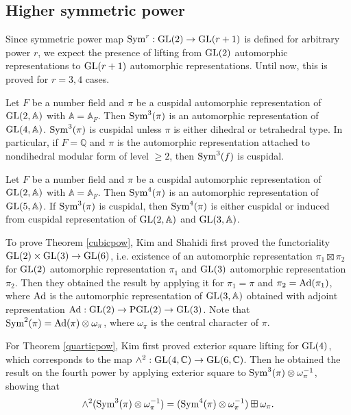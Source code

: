 \subsection{Higher symmetric power}
Since symmetric power map $\mathrm{Sym}^{r}:\operatorname{\mathrm{GL}}(2) \to \operatorname{\mathrm{GL}}(r+1)$ is defined for arbitrary power $r$, we expect the presence of lifting from $\operatorname{\mathrm{GL}}(2)$ automorphic representations to $\operatorname{\mathrm{GL}}(r+1)$ automorphic representations.
Until now, this is proved for $r = 3, 4$ cases.

\begin{theorem}
\label{cubicpow}
Let $F$ be a number field and $\pi$ be a cuspidal automorphic representation of $\operatorname{\mathrm{GL}}(2, \mathbb{A})$ with $\mathbb{A} = \mathbb{A}_{F}$.
Then $\mathrm{Sym}^{3}(\pi)$ is an automorphic representation of $\operatorname{\mathrm{GL}}(4, \mathbb{A})$.
$\mathrm{Sym}^{3}(\pi)$ is cuspidal unless $\pi$ is either dihedral or tetrahedral type.
In particular, if $F = \mathbb{Q}$ and $\pi$ is the automorphic representation attached to nondihedral modular form of level $\geq 2$, then $\mathrm{Sym}^{3}(f)$ is cuspidal.
\end{theorem}


\begin{theorem}
\label{quarticpow}
Let $F$ be a number field and $\pi$ be a cuspidal automorphic representation of $\operatorname{\mathrm{GL}}(2, \mathbb{A})$ with $\mathbb{A} = \mathbb{A}_{F}$.
Then $\mathrm{Sym}^{4}(\pi)$ is an automorphic representation of $\operatorname{\mathrm{GL}}(5, \mathbb{A})$.
If $\mathrm{Sym}^{3}(\pi)$ is cuspidal, then $\mathrm{Sym}^{4}(\pi)$ is either cuspidal or induced from cuspidal representation of $\operatorname{\mathrm{GL}}(2, \mathbb{A})$ and $\operatorname{\mathrm{GL}}(3, \mathbb{A})$.
\end{theorem}

To prove Theorem \ref{cubicpow}, Kim and Shahidi first proved the functoriality $\operatorname{\mathrm{GL}}(2) \times \operatorname{\mathrm{GL}}(3) \to \operatorname{\mathrm{GL}}(6)$, i.e. existence of an automorphic representation $\pi_{1} \boxtimes \pi_{2}$ for $\operatorname{\mathrm{GL}}(2)$ automorphic representation $\pi_{1}$ and $\operatorname{\mathrm{GL}}(3)$ automorphic representation $\pi_{2}$.
Then they obtained the result by applying it for $\pi_{1} = \pi$ and $\pi_{2}  = \operatorname{\mathrm{Ad}}(\pi_{1})$, where $\operatorname{\mathrm{Ad}}$ is the automorphic representation of $\operatorname{\mathrm{GL}}(3, \mathbb{A})$ obtained with adjoint representation $\operatorname{\mathrm{Ad}}: \operatorname{\mathrm{GL}}(2) \to \operatorname{\mathrm{PGL}}(2) \to \operatorname{\mathrm{GL}}(3)$.
Note that $\mathrm{Sym}^{2}(\pi) = \operatorname{\mathrm{Ad}}(\pi) \otimes \omega_{\pi}$, where $\omega_{\pi}$ is the central character of $\pi$. 

For Theorem \ref{quarticpow}, Kim first proved exterior square lifting for $\operatorname{\mathrm{GL}}(4)$, which corresponds to the map $\wedge^{2}:\operatorname{\mathrm{GL}}(4, \mathbb{C}) \to \operatorname{\mathrm{GL}}(6, \mathbb{C})$.
Then he obtained the result on the fourth power by applying exterior square to $\mathrm{Sym}^{3}(\pi) \otimes \omega_{\pi}^{-1}$, showing that 
$$
\wedge^{2}(\mathrm{Sym}^{3}(\pi) \otimes \omega_{\pi}^{-1}) = (\mathrm{Sym}^{4}(\pi) \otimes \omega_{\pi}^{-1}) \boxplus \omega_{\pi}.
$$

